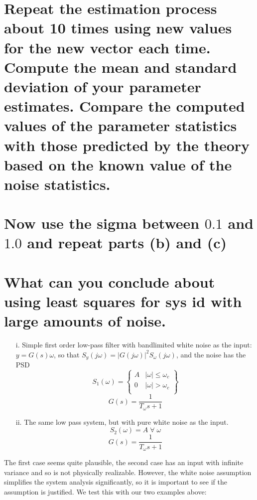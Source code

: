 \documentclass[12pt,letterpaper, onecolumn]{exam}
\begin{document}
\begin{questions}
\begin{parts}
\begin{subparts}

            \solution{}
        \end{subparts}


        \part{Repeat the estimation process about 10 times using new values for the new vector each time. Compute the mean and standard deviation of your parameter estimates. Compare the computed values of the parameter statistics with those predicted by the theory based on the known value of the noise statistics.}
        \solution{}

        \part{Now use the sigma between $0.1$ and $1.0$ and repeat parts (b) and (c)}

        \solution{}

        \part{What can you conclude about using least squares for sys id with large amounts of noise.}

        \solution{}
    \end{parts}
    \clearpage
    \begin{itemize}
        \item[i.]{Simple first order low-pass filter with bandlimited white noise as the input:
        $y = G(s)\omega$, so that $S_y(j\omega) = \left\vert G(j\omega) \right\vert^2S_{\omega}(j\omega)$, and the noise has the PSD
        \[S_1(\omega) =
            \begin{Bmatrix}
                A & \vert \omega \vert \leq \omega_c \\
                0 & \vert \omega \vert > \omega_c    \\
            \end{Bmatrix} \]
        \[G(s) = \frac{1}{T_{\omega}s + 1} \]
        }
        \item[ii.]{The same low pass system, but with pure white noise as the input.
                    \[S_2(\omega) = A\;\forall\;\omega   \]
                    \[G(s) = \frac{1}{T_{\omega}s + 1} \]
              }
    \end{itemize}
    The first case seems quite plausible, the second case has an input with infinite variance and so is not physically realizable. However, the white noise assumption simplifies the system analysis significantly, so it is important to see if the assumption is justified. We test this with our two examples above:
    \begin{parts}

\end{parts}
\end{questions}
\end{document}
